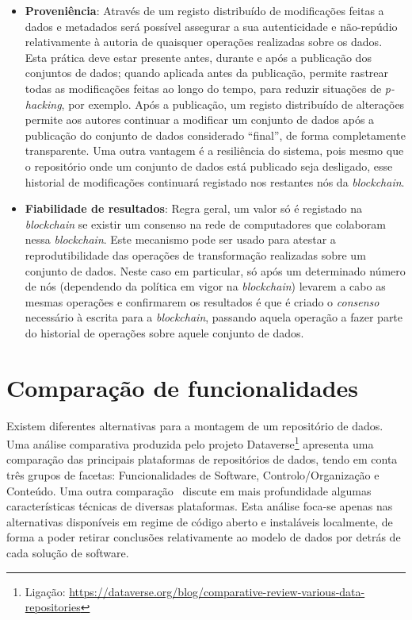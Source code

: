 \documentclass[sigconf,nonacm]{acmart}
\begin{document}
\begin{itemize}
	\item \textbf{Proveniência}: Através de um registo distribuído de modificações feitas a dados e metadados será possível assegurar a sua autenticidade e não-repúdio relativamente à autoria de quaisquer operações realizadas sobre os dados. Esta prática deve estar presente antes, durante e após a publicação dos conjuntos de dados; quando aplicada antes da publicação, permite rastrear todas as modificações feitas ao longo do tempo, para reduzir situações de \emph{p-hacking}\cite{10.1371/journal.pbio.1002106}, por exemplo. Após a publicação, um registo distribuído de alterações permite aos autores continuar a modificar um conjunto de dados após a publicação do conjunto de dados considerado ``final'', de forma completamente transparente. Uma outra vantagem é a resiliência do sistema, pois mesmo que o repositório onde um conjunto de dados está publicado seja desligado, esse historial de modificações continuará registado nos restantes nós da \emph{blockchain}.
	\item \textbf{Fiabilidade de resultados}: Regra geral, um valor só é registado na \emph{blockchain} se existir um consenso na rede de computadores que colaboram nessa \emph{blockchain}. Este mecanismo pode ser usado para atestar a reprodutibilidade das operações de transformação realizadas sobre um conjunto de dados. Neste caso em particular, só após um determinado número de nós (dependendo da política em vigor na \emph{blockchain}) levarem a cabo as mesmas operações e confirmarem os resultados é que é criado o \emph{consenso} necessário à escrita para a \emph{blockchain}, passando aquela operação a fazer parte do historial de operações sobre aquele conjunto de dados. 
\end{itemize}



\section{Comparação de funcionalidades} %
\label{sec:comparacao_de_funcionalidades}

Existem diferentes alternativas para a montagem de um repositório de dados. Uma análise comparativa produzida pelo projeto Dataverse\footnote{Ligação:  \url{https://dataverse.org/blog/comparative-review-various-data-repositories}} apresenta uma comparação das principais plataformas de repositórios de dados, tendo em conta três grupos de facetas: Funcionalidades de Software, Controlo/Organização e Conteúdo. Uma outra comparação~\cite{amorimComparison2017} discute em mais profundidade algumas características técnicas de diversas plataformas. Esta análise foca-se apenas nas alternativas disponíveis em regime de código aberto e instaláveis localmente, de forma a poder retirar conclusões relativamente ao modelo de dados por detrás de cada solução de software. 
\end{document}
